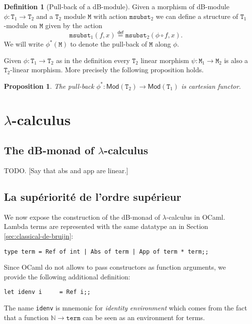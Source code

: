\documentclass[a4paper,twoside,12pt]{article}
\newtheorem{proposition}{Proposition}
\theoremstyle{definition}
\newtheorem{definition}{Definition}
\theoremstyle{remark}
\theoremstyle{example}
\newcommand{\NN}{\mathbb{N}}
\newcommand{\TT}{\mathtt{T}}
\newcommand{\MM}{\mathtt{M}}
\newcommand{\msubst}{\mathtt{msubst}}
\begin{document}
\begin{definition}[Pull-back of a dB-module]
  Given a morphism of dB-module $\phi\colon \TT_1 \to \TT_2$ and a
  $\TT_2$ module $\MM$ with action $\msubst_2$ we can define a
  structure of $\TT_1$-module on $\MM$ given by the action
  \begin{equation*}
    \msubst_1(f,x) \stackrel{\mathsf{def}}{=} \msubst_2(\phi \circ f, x).
  \end{equation*}
  We will write $\phi^*(\MM)$ to denote the pull-back of $\MM$ along
  $\phi$.
\end{definition}

Given $\phi\colon \TT_1 \to \TT_2$ as in the definition every $\TT_2$
linear morphism $\psi\colon \MM_1 \to \MM_2$ is also a $\TT_2$-linear
morphism.  More precisely the following proposition holds.

\begin{proposition}
  \label{prop:pull-back-functor}
  The pull-back
  $\phi^* \colon \mathsf{Mod}(\TT_2) \to \mathsf{Mod}(\TT_1)$ is
  cartesian functor.
\end{proposition}

\section{$\lambda$-calculus}
\label{sec:lambda-calculus}

\subsection{The dB-monad of $\lambda$-calculus}
\label{sec:db-monad-lambda}

TODO.
[Say that abs and app are linear.]

\subsection{La supériorité de l'ordre supérieur}
\label{sec:super}

We now expose the construction of the dB-monad of $\lambda$-calculus
in OCaml.  Lambda terms are represented with the same datatype an in
Section \ref{sec:classical-de-bruijn}:
\begin{verbatim}
type term = Ref of int | Abs of term | App of term * term;;
\end{verbatim}

Since OCaml do not allows to pass constructors as function arguments,
we provide the following additional definition:
\begin{verbatim}
let idenv i     = Ref i;;
\end{verbatim}
The name \texttt{idenv} is mnemonic for \emph{identity environment}
which comes from the fact that a function $\NN \to \mathtt{term}$ can
be seen as an environment for terms.
\end{document}

